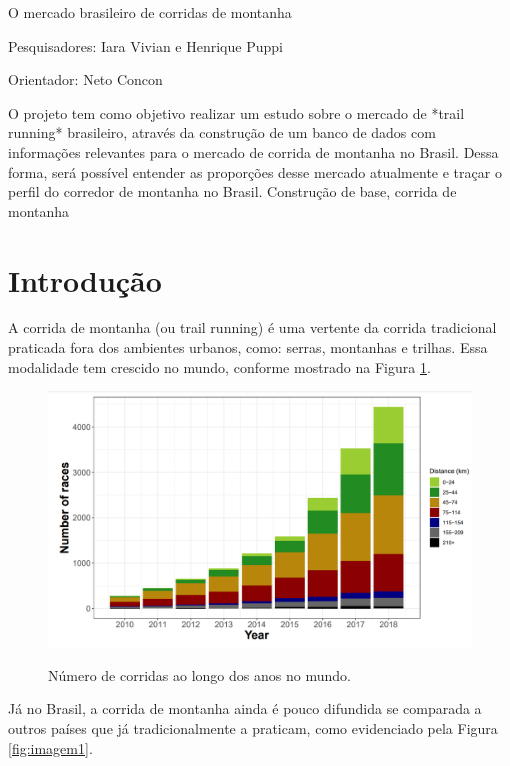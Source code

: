 \relatorio
{O mercado brasileiro de corridas de montanha}
{
    \noindent Pesquisadores: Iara Vivian e Henrique Puppi
    
    \noindent Orientador: Neto Concon
}
{
   O projeto tem como objetivo realizar um estudo sobre o mercado de *trail running* brasileiro, através da construção de um banco de dados com informações relevantes para o mercado de corrida de montanha no Brasil. Dessa forma, será possível entender as proporções desse mercado atualmente e traçar o perfil do corredor de montanha no Brasil.
}
{
    Construção de base, corrida de montanha
}

\section{Introdução}

A corrida de montanha (ou trail running) é uma vertente da corrida tradicional praticada fora dos ambientes urbanos, como: serras, montanhas e trilhas. Essa modalidade tem crescido no mundo, conforme mostrado na Figura \ref{fig:logo}.

\begin{figure} [H]
    \centering
    \caption{Número de corridas ao longo dos anos no mundo.}
    \includegraphics[width = 0.9\linewidth]{relatorios/paraty/figuras/image1.png}
    \label{fig:logo}
\end{figure}

Já no Brasil, a corrida de montanha ainda é pouco difundida se comparada a outros países que já tradicionalmente a praticam, como evidenciado pela Figura \ref{fig:imagem1}.


